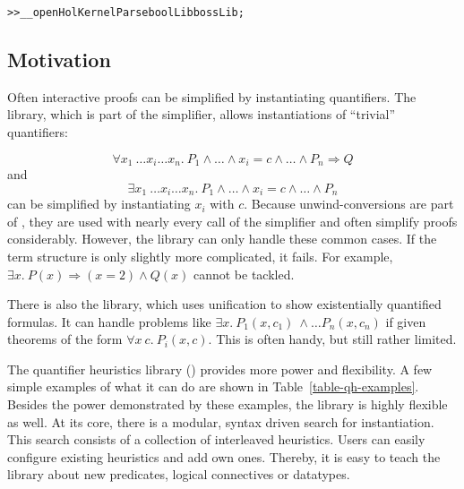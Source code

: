\begin{session}
\begin{alltt}
>>__ open HolKernel Parse boolLib bossLib;
\end{alltt}
\end{session}


\setcounter{sessioncount}{0}

\subsection{Motivation}

Often interactive proofs can be simplified by instantiating
quantifiers. The  library, which is part of the simplifier, allows
instantiations of ``trivial'' quantifiers:

\[ \forall x_1\ \ldots x_i \ldots x_n.\ P_1 \wedge \ldots \wedge x_i = c \wedge \ldots \wedge P_n \Longrightarrow Q \]
and
\[ \exists x_1\ \ldots x_i \ldots x_n.\ P_1 \wedge \ldots \wedge x_i =
c \wedge \ldots \wedge P_n \] can be simplified by
instantiating $x_i$ with $c$. Because unwind-conversions are
part of , they are used with nearly every call of the simplifier
and often simplify proofs considerably. However, the  library can only handle these common cases. If the term structure is
only slightly more complicated, it fails. For example, $\exists x.\ P(x) \Longrightarrow (x = 2) \wedge Q(x)$
cannot be tackled.

There is also the  library, which uses
unification to show existentially quantified formulas. It can handle
problems like $\exists x.\ P_1(x,c_1)\ \wedge \ldots P_n(x,c_n)$ if
given theorems of the form $\forall x\ c.\ P_i(x, c)$. This is often
handy, but still rather limited.

The quantifier heuristics library () provides more power
and flexibility. A few simple examples of what it can do
are shown in Table~\ref{table-qh-examples}. Besides the power demonstrated
by these examples, the library is highly flexible as well.  At its
core, there is a modular, syntax driven search for instantiation.
This search consists of a collection of interleaved heuristics.  Users
can easily configure existing heuristics and add own ones. Thereby, it
is easy to teach the library about new predicates, logical connectives
or datatypes.

